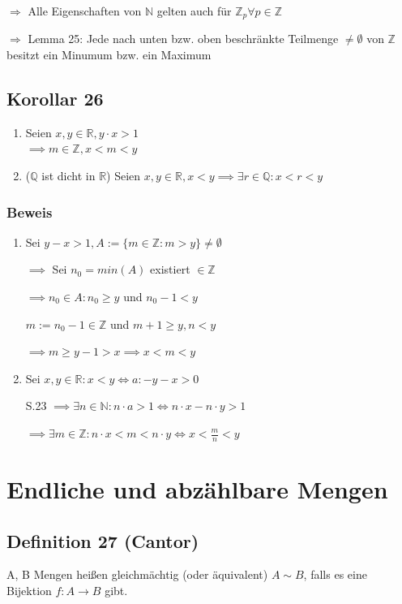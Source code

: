 \documentclass[fleqn]{scrbook}
\newcommand{\R}{\mathbb{R}}
\newcommand{\N}{\mathbb{N}}
\begin{document}
$\Rightarrow$ Alle Eigenschaften von $\N$ gelten auch für $\mathbb{Z}_p \forall p \in \mathbb{Z}$

$\Rightarrow$ Lemma 25: Jede nach unten bzw. oben beschränkte Teilmenge $\neq \emptyset$ von $\mathbb{Z}$ besitzt ein Minumum bzw. ein Maximum
\subsection{Korollar 26}
\begin{enumerate}[1)]
\item Seien $x,y \in \R, y \cdot x > 1$\\$\implies m\in\mathbb{Z}, x < m < y$
\item ($\mathbb{Q}$ ist dicht in $\R$) Seien $x,y \in \R, x < y \implies \exists r \in \mathbb{Q}: x < r <y$
\end{enumerate}
\subsubsection{Beweis} 
\begin{enumerate}[1)]
\item Sei $y - x > 1, A := \{ m \in \mathbb{Z}: m > y\} \neq \emptyset$

$\implies$ Sei $n_0 = min(A)$ existiert $\in \mathbb{Z}$

$\implies n_0 \in A: n_0 \geq y$ und $n_0 -1 < y$

$m:=n_0 -1 \in \mathbb{Z}$ und $m + 1 \geq y, n <y$

$\implies m \geq y -1 > x \implies x < m < y$

\item Sei $x,y \in \R: x < y \iff a: -y -x > 0$

S.23 $\implies \exists n \in \N: n  \cdot  a > 1 \iff n  \cdot  x - n  \cdot  y > 1$

$\implies \exists m \in \mathbb{Z}: n \cdot x<m<n \cdot y \iff x <\frac{m}{n} < y$
\end{enumerate}

\section{Endliche und abzählbare Mengen}

\subsection{Definition 27 (Cantor)} A, B Mengen heißen gleichmächtig (oder äquivalent) $A \sim B$, falls es eine Bijektion $f: A \rightarrow B$ gibt.
\end{document}
